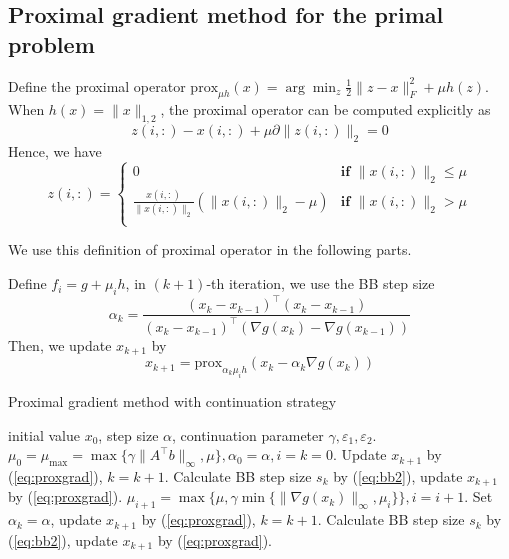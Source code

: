 \documentclass{article}
\numberwithin{equation}{section}
\numberwithin{figure}{section}
\begin{document}
\subsection{Proximal gradient method for the primal problem}
Define the proximal operator $\mathrm{prox}_{\mu h}(x)=\arg\min_z \frac{1}{2}\|z-x\|_F^2+\mu h(z)$. When $h(x)=\|x\|_{1,2}$, the proximal operator can be computed explicitly as 
\begin{equation}
    z(i,:)-x(i,:)+\mu \partial\|z(i,:)\|_2=0
\end{equation}
Hence, we have
\begin{equation}
    z(i,:) = \begin{cases}
    0 &\textbf{if } \|x(i,:)\|_2\leq \mu\\
    \frac{x(i,:)}{\|x(i,:)\|_2}(\|x(i,:)\|_2-\mu) &\textbf{if } \|x(i,:)\|_2> \mu\\
    \end{cases}
\end{equation}

We use this definition of proximal operator in the following parts.

Define $f_i=g+\mu_i h$, in $(k+1)$-th iteration, we use the BB step size 
\begin{equation}
    \alpha_k = \frac{(x_k-x_{k-1})^\top (x_k-x_{k-1})}{(x_k-x_{k-1})^\top(\nabla g(x_k)-\nabla g(x_{k-1}))} \label{eq:bb2}
\end{equation}
Then, we update $x_{k+1}$ by
\begin{equation}
    x_{k+1}=\mathrm{prox}_{\alpha_k \mu_i h}(x_k-\alpha_k \nabla g(x_k))\label{eq:proxgrad}
\end{equation}


\begin{algorithm}[!htbp]\caption{Proximal gradient method with continuation strategy}\label{alg:proxgrad}
\begin{algorithmic}[1]
 initial value $x_0$, step size $\alpha$, continuation parameter $\gamma, \varepsilon_1, \varepsilon_2$.
\STATE $\mu_0=\mu_{\max}=\max\{\gamma\|A^\top b\|_\infty,\mu\},\alpha_0=\alpha, i = k=0$.
\STATE Update $x_{k+1}$ by (\ref{eq:proxgrad}), $k = k+1$.
\STATE Calculate BB step size $s_k$ by (\ref{eq:bb2}), update $x_{k+1}$ by (\ref{eq:proxgrad}).
\ENDFOR
\STATE $\mu_{i+1}=\max\{\mu, \gamma\min\{\|\nabla g(x_k)\|_\infty, \mu_i\} \},  i = i+1$.
\STATE Set $\alpha_k = \alpha$, update $x_{k+1}$ by (\ref{eq:proxgrad}), $k=k+1$.
\ENDWHILE
{}
\STATE Calculate BB step size $s_k$ by (\ref{eq:bb2}), update $x_{k+1}$ by (\ref{eq:proxgrad}).
\ENDFOR
\end{algorithmic}
\end{algorithm}
\end{document}
